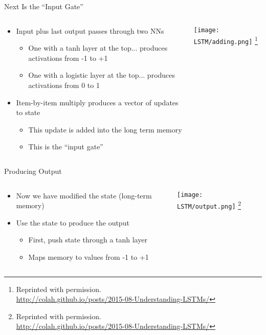 \documentclass[aspectratio=169]{beamer}
\begin{document}
\begin{frame}{Next Is the ``Input Gate''}

\begin{columns}
\begin{column}{0.5\textwidth}
\begin{itemize}
	\item Input plus last output passes through two NNs
	\begin{itemize}
		\item One with a tanh layer at the top...
		produces activations from -1 to +1
		\item One with a logistic layer at the top...
		produces activations from 0 to 1
	\end{itemize}
	\item Item-by-item multiply produces a vector of updates to state
	\begin{itemize}
		\item This update is added into the long term memory
		\item This is the ``input gate''
	\end{itemize}
\end{itemize}
\end{column}
\begin{column}{0.5\textwidth}
\texttt{[image: LSTM/adding.png]}
\footnote{Reprinted with permission.\\ \hspace{1.7em}\url{http://colah.github.io/posts/2015-08-Understanding-LSTMs/}}
\end{column}
\end{columns}
\end{frame}
\begin{frame}{Producing Output}

\begin{columns}
\begin{column}{0.5\textwidth}
\begin{itemize}
	\item Now we have modified the state (long-term memory)
	\item Use the state to produce the output
	\begin{itemize}
		\item First, push state through a tanh layer
		\item Maps memory to values from -1 to +1
	\end{itemize}
\end{itemize}
\end{column}
\begin{column}{0.5\textwidth}
\texttt{[image: LSTM/output.png]}
\footnote{Reprinted with permission.\\ \hspace{1.7em}\url{http://colah.github.io/posts/2015-08-Understanding-LSTMs/}}
\end{column}
\end{columns}
\end{frame}
\end{document}
